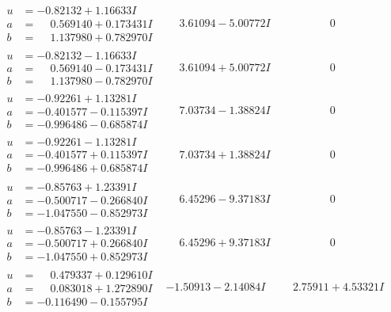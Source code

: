 \documentclass[1p]{elsarticle_modified}
\theoremstyle{definition}
\begin{document}
$$\begin{array}{c|c|c}
\begin{aligned}
u &= -0.82132 + 1.16633 I \\
a &= \phantom{-}0.569140 + 0.173431 I \\
b &= \phantom{-}1.137980 + 0.782970 I\end{aligned}
 & \phantom{-}3.61094 - 5.00772 I & \phantom{-0.000000 } 0 \\ \hline\begin{aligned}
u &= -0.82132 - 1.16633 I \\
a &= \phantom{-}0.569140 - 0.173431 I \\
b &= \phantom{-}1.137980 - 0.782970 I\end{aligned}
 & \phantom{-}3.61094 + 5.00772 I & \phantom{-0.000000 } 0 \\ \hline\begin{aligned}
u &= -0.92261 + 1.13281 I \\
a &= -0.401577 - 0.115397 I \\
b &= -0.996486 - 0.685874 I\end{aligned}
 & \phantom{-}7.03734 - 1.38824 I & \phantom{-0.000000 } 0 \\ \hline\begin{aligned}
u &= -0.92261 - 1.13281 I \\
a &= -0.401577 + 0.115397 I \\
b &= -0.996486 + 0.685874 I\end{aligned}
 & \phantom{-}7.03734 + 1.38824 I & \phantom{-0.000000 } 0 \\ \hline\begin{aligned}
u &= -0.85763 + 1.23391 I \\
a &= -0.500717 - 0.266840 I \\
b &= -1.047550 - 0.852973 I\end{aligned}
 & \phantom{-}6.45296 - 9.37183 I & \phantom{-0.000000 } 0 \\ \hline\begin{aligned}
u &= -0.85763 - 1.23391 I \\
a &= -0.500717 + 0.266840 I \\
b &= -1.047550 + 0.852973 I\end{aligned}
 & \phantom{-}6.45296 + 9.37183 I & \phantom{-0.000000 } 0 \\ \hline\begin{aligned}
u &= \phantom{-}0.479337 + 0.129610 I \\
a &= \phantom{-}0.083018 + 1.272890 I \\
b &= -0.116490 - 0.155795 I\end{aligned}
 & -1.50913 - 2.14084 I & \phantom{-}2.75911 + 4.53321 I \\ \hline\begin{aligned}

\end{aligned}
\end{array}$$
\end{document}
